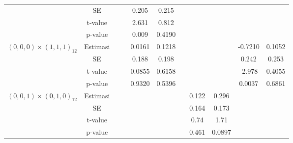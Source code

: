 \begin{enumerate}[label=\alph*.]
\begin{longtable}{|c|c|c|c|c|c|c|c|c|c|c|}
            & SE
            & {} & {}
            & {0.205} & {0.215} & {}
            & {} & {}
            & {} & {} \\ \cline{2-11}

            & t-value
            & {} & {}
            & {2.631} & {0.812} & {}
            & {} & {}
            & {} & {} \\ \cline{2-11}

            & p-value
            & {} & {}
            & {0.009} & {0.4190} & {}
            & {} & {}
            & {} & {} \\ \hline

            \multirow{4}{*}{$(0,0,0)\times(1,1,1)_{12}$}
            & Estimasi
            & {} & {}
            & {0.0161} & {0.1218} & {}
            & {} & {}
            & {-0.7210} & {0.1052} \\ \cline{2-11}

            & SE
            & {} & {}
            & {0.188} & {0.198} & {}
            & {} & {}
            & {0.242} & {0.253} \\ \cline{2-11}

            & t-value
            & {} & {}
            & {0.0855} & {0.6158} & {}
            & {} & {}
            & {-2.978} & {0.4055} \\ \cline{2-11}

            & p-value
            & {} & {}
            & {0.9320} & {0.5396} & {}
            & {} & {}
            & {0.0037} & {0.6861} \\ \hline

            \multirow{4}{*}{$(0,0,1)\times(0,1,0)_{12}$}
            & Estimasi
            & {} & {}
            & {} & {} & {}
            & {0.122} & {0.296}
            & {} & {} \\ \cline{2-11}

            & SE
            & {} & {}
            & {} & {} & {}
            & {0.164} & {0.173}
            & {} & {} \\ \cline{2-11}

            & t-value
            & {} & {}
            & {} & {} & {}
            & {0.74} & {1.71}
            & {} & {} \\ \cline{2-11}

            & p-value
            & {} & {}
            & {} & {} & {}
            & {0.461} & {0.0897}
            & {} & {} \\ \hline


\end{longtable}
\end{enumerate}
